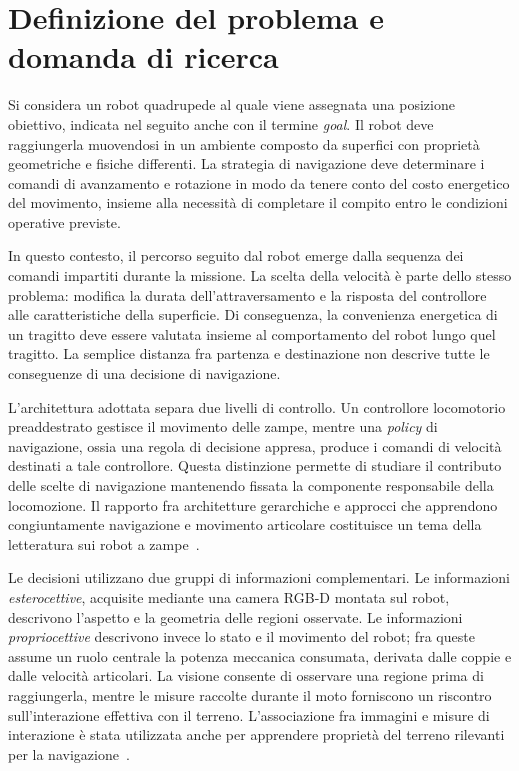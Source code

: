 \section{Definizione del problema e domanda di ricerca}
\label{sec:intro-problema}

Si considera un robot quadrupede al quale viene assegnata una posizione obiettivo, indicata nel seguito anche con il termine \emph{goal}. Il robot deve raggiungerla muovendosi in un ambiente composto da superfici con proprietà geometriche e fisiche differenti. La strategia di navigazione deve determinare i comandi di avanzamento e rotazione in modo da tenere conto del costo energetico del movimento, insieme alla necessità di completare il compito entro le condizioni operative previste.

In questo contesto, il percorso seguito dal robot emerge dalla sequenza dei comandi impartiti durante la missione. La scelta della velocità è parte dello stesso problema: modifica la durata dell'attraversamento e la risposta del controllore alle caratteristiche della superficie. Di conseguenza, la convenienza energetica di un tragitto deve essere valutata insieme al comportamento del robot lungo quel tragitto. La semplice distanza fra partenza e destinazione non descrive tutte le conseguenze di una decisione di navigazione.

L'architettura adottata separa due livelli di controllo. Un controllore locomotorio preaddestrato gestisce il movimento delle zampe, mentre una \emph{policy} di navigazione, ossia una regola di decisione appresa, produce i comandi di velocità destinati a tale controllore. Questa distinzione permette di studiare il contributo delle scelte di navigazione mantenendo fissata la componente responsabile della locomozione. Il rapporto fra architetture gerarchiche e approcci che apprendono congiuntamente navigazione e movimento articolare costituisce un tema della letteratura sui robot a zampe~\citep{Rudin2022Advanced}.

Le decisioni utilizzano due gruppi di informazioni complementari. Le informazioni \emph{esterocettive}, acquisite mediante una camera RGB-D montata sul robot, descrivono l'aspetto e la geometria delle regioni osservate. Le informazioni \emph{propriocettive} descrivono invece lo stato e il movimento del robot; fra queste assume un ruolo centrale la potenza meccanica consumata, derivata dalle coppie e dalle velocità articolari. La visione consente di osservare una regione prima di raggiungerla, mentre le misure raccolte durante il moto forniscono un riscontro sull'interazione effettiva con il terreno. L'associazione fra immagini e misure di interazione è stata utilizzata anche per apprendere proprietà del terreno rilevanti per la navigazione~\citep{Wellhausen2019Where}.

